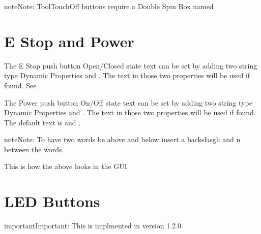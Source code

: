 \documentclass[letterpaper,10pt,english]{sphinxmanual}
\begin{document}
\begin{sphinxadmonition}{note}{Note:}
\sphinxAtStartPar
Tool\sphinxhyphen{}Touch\sphinxhyphen{}Off buttons require a Double Spin Box named
\end{sphinxadmonition}


\section{E Stop and Power}
\label{\detokenize{controls:e-stop-and-power}}
\sphinxAtStartPar
The E Stop push button Open/Closed state text can be set by adding two string
type Dynamic Properties  and . The text in those two
properties will be used if found. See {\hyperref[\detokenize{property::doc}]{}}


\sphinxAtStartPar
The Power push button On/Off state text can be set by adding two string type
Dynamic Properties  and . The text in those two properties
will be used if found. The default text is  and
.


\begin{sphinxadmonition}{note}{Note:}
\sphinxAtStartPar
To have two words be above and below insert a backslasgh and n between the words.
\end{sphinxadmonition}


\sphinxAtStartPar
This is how the above looks in the GUI



\section{LED Buttons}
\label{\detokenize{controls:led-buttons}}\label{\detokenize{controls:id1}}
\begin{sphinxadmonition}{important}{Important:}
\sphinxAtStartPar
This is implmented in version 1.2.0.
\end{sphinxadmonition}
\end{document}
